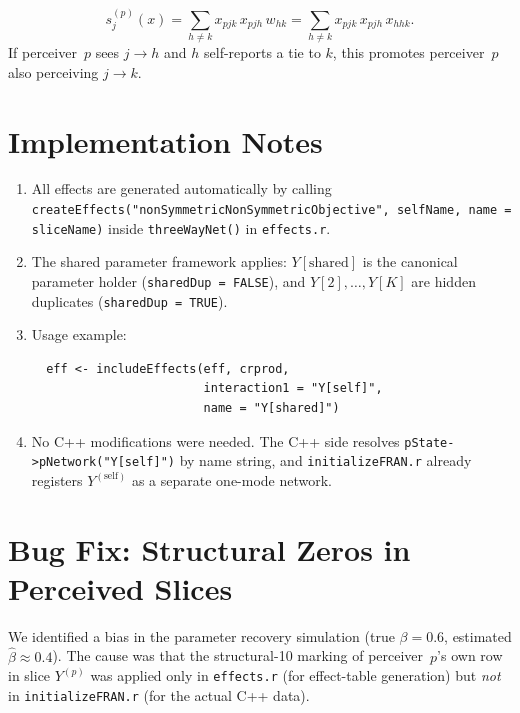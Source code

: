 \documentclass[11pt]{article}
\newcommand{\self}{\mathrm{self}}
\begin{document}
\[
  s_{j}^{(p)}(x) = \sum_{h \neq k} x_{pjk}\, x_{pjh}\, w_{hk}
  = \sum_{h \neq k} x_{pjk}\, x_{pjh}\, x_{hhk}.
\]
If perceiver~$p$ sees $j \to h$ and $h$ self-reports a tie to $k$,
this promotes perceiver~$p$ also perceiving $j \to k$.

\section{Implementation Notes}

\begin{enumerate}[leftmargin=*]
\item
  All effects are generated automatically by calling
  \texttt{createEffects("nonSymmetricNonSymmetricObjective",
  selfName, name = sliceName)} inside \texttt{threeWayNet()} in
  \texttt{effects.r}.

\item
  The shared parameter framework applies:
  $Y[\text{shared}]$ is the canonical parameter holder
  (\texttt{sharedDup = FALSE}), and
  $Y[2], \dots, Y[K]$ are hidden duplicates
  (\texttt{sharedDup = TRUE}).

\item
  Usage example:
  \begin{verbatim}
  eff <- includeEffects(eff, crprod,
                        interaction1 = "Y[self]",
                        name = "Y[shared]")
  \end{verbatim}

\item
  No C++ modifications were needed.
  The C++ side resolves
  \texttt{pState->pNetwork("Y[self]")} by name string, and
  \texttt{initializeFRAN.r} already registers $Y^{(\self)}$ as a
  separate one-mode network.
\end{enumerate}

\section{Bug Fix: Structural Zeros in Perceived Slices}

We identified a bias in the parameter recovery simulation
(true $\beta = 0.6$, estimated $\hat\beta \approx 0.4$).
The cause was that the structural-10 marking of perceiver~$p$'s own row
in slice $Y^{(p)}$ was applied only in \texttt{effects.r}
(for effect-table generation) but \emph{not} in \texttt{initializeFRAN.r}
(for the actual C++ data).
\end{document}
